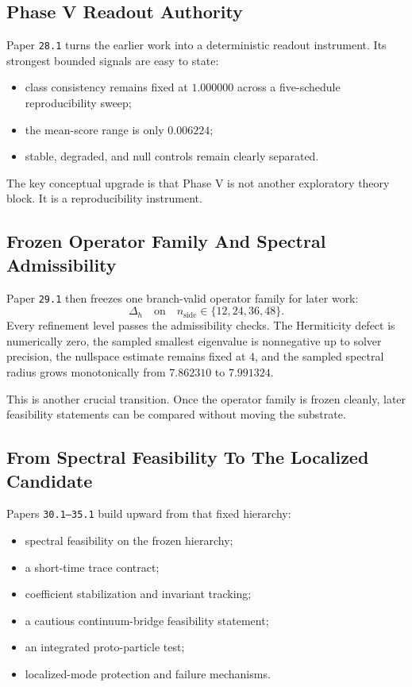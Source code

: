 \documentclass[11pt]{article}
\begin{document}
\subsection{Phase V Readout Authority}

Paper \texttt{28.1} turns the earlier work into a deterministic readout instrument. Its strongest bounded signals are easy to state:
\begin{itemize}
\item class consistency remains fixed at $1.000000$ across a five-schedule reproducibility sweep;
\item the mean-score range is only $0.006224$;
\item stable, degraded, and null controls remain clearly separated.
\end{itemize}

The key conceptual upgrade is that Phase V is not another exploratory theory block. It is a reproducibility instrument.

\subsection{Frozen Operator Family And Spectral Admissibility}

Paper \texttt{29.1} then freezes one branch-valid operator family for later work:
\[
\Delta_h
\quad \text{on} \quad
n_{\mathrm{side}} \in \{12,24,36,48\}.
\]
Every refinement level passes the admissibility checks. The Hermiticity defect is numerically zero, the sampled smallest eigenvalue is nonnegative up to solver precision, the nullspace estimate remains fixed at $4$, and the sampled spectral radius grows monotonically from $7.862310$ to $7.991324$.

This is another crucial transition. Once the operator family is frozen cleanly, later feasibility statements can be compared without moving the substrate.

\subsection{From Spectral Feasibility To The Localized Candidate}

Papers \texttt{30.1--35.1} build upward from that fixed hierarchy:
\begin{itemize}
\item spectral feasibility on the frozen hierarchy;
\item a short-time trace contract;
\item coefficient stabilization and invariant tracking;
\item a cautious continuum-bridge feasibility statement;
\item an integrated proto-particle test;
\item localized-mode protection and failure mechanisms.
\end{itemize}
\end{document}
